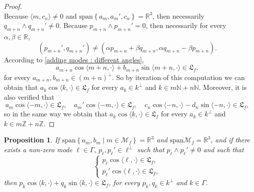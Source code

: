 \documentclass[10pt]{article}
\newcommand{\R}{{\mathbb R}}
\newcommand{\N}{{\mathbb N}}
\newcommand{\Z}{{\mathbb Z}}
\newcommand{\M}{{\mathcal M}}
\newcommand{\la}{\langle}
\newcommand{\ra}{\rangle}
\newcommand{\we}{\wedge}
\newtheorem{prop}{Proposition}
\begin{document}
\begin{proof}
\begin{equation*}
    \end{equation*}
    Because $\la m,c_n\ra\neq 0$ and $\mathrm{span} \left\{a_m,a_m',c_n\right\}=\R^3$, then necessarily $q_{m+n}\we q_{m+n}'\neq 0$. Because $p_{m+n}\we p_{m+n}'=0$, then necessarily for every $\alpha,\beta \in \R$,
    \begin{equation*}
        (p_{m+n}',q_{m+n}')\neq (\alpha p_{m+n}+\beta q_{m+n},\alpha q_{m+n}-\beta p_{m+n}).
    \end{equation*}
    According to \cref{adding modes : different angles}, 
    \begin{equation}
        a_{m+n}\cos \la m+n,\cdot \ra+b_{m+n}\sin \la m+n,\cdot \ra \in \mathfrak{L}_f,
    \end{equation}
    for every $a_{m+n},b_{m+n}\in (m+n)^{\perp}$. So by iteration of this computation we can obtain that $a_k\cos\la k,\cdot \ra \in \mathfrak{L}_f$ for every $a_k\in k^{\perp}$ and $k\in m\N+n\N$. Moreover, it is also verified that
    \begin{equation*}
        a_m \cos \la -m,\cdot \ra \in \mathfrak{L}_f, \quad a_m'\cos \la -m, \cdot \ra \in \mathfrak{L}_f, \quad c_n\cos \la -n,\cdot \ra - d_n\sin \la -n,\cdot \ra \in \mathfrak{L}_f,
    \end{equation*}
    so in the same way we obtain that $a_k \cos \la k,\cdot \ra \in \mathfrak{L}_f$ for every $a_k \in k^{\perp}$ and $k \in m\Z+n\Z$.
    \end{proof}

\begin{prop} \label{generation of every modes dimV0=3 dim I0=3}
    If $\mathrm{span}\left\{a_m,b_m \mid m \in \M_f \right\}=\R^3$ and $\mathrm{span}\M_f = \R^3$, and if there exists a non-zero mode $\ell \in \Gamma$, $p_{\ell},p_\ell'\in \ell^{\perp}$ such that $p_\ell\we p_\ell'\neq 0$ and such that 
    \begin{equation*}
        \left\{\begin{array}{ll}
             p_\ell \cos \la \ell,\cdot \ra \in \mathfrak{L}_f,\\
             p_\ell'\cos \la \ell,\cdot \ra \in \mathfrak{L}_f,
        \end{array}\right.
    \end{equation*}
    then $p_k\cos \la k,\cdot \ra +q_k \sin \la k,\cdot \ra \in \mathfrak{L}_f$, for every $p_k,q_k\in k^{\perp}$ and $k \in \Gamma$.
\end{prop}
\end{document}
